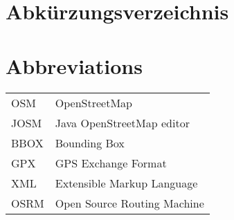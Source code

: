 \ifmmtlanguagegerman
\section*{Abkürzungsverzeichnis}
\else
\section*{Abbreviations}
\fi

\begin{table}[h]		
	\begin{tabular}{ll}
		OSM & OpenStreetMap \\
		JOSM & Java OpenStreetMap editor \\
		BBOX & Bounding Box \\
		GPX & GPS Exchange Format \\
		XML & Extensible Markup Language \\
		OSRM & Open Source Routing Machine \\
	\end{tabular}
\end{table}
